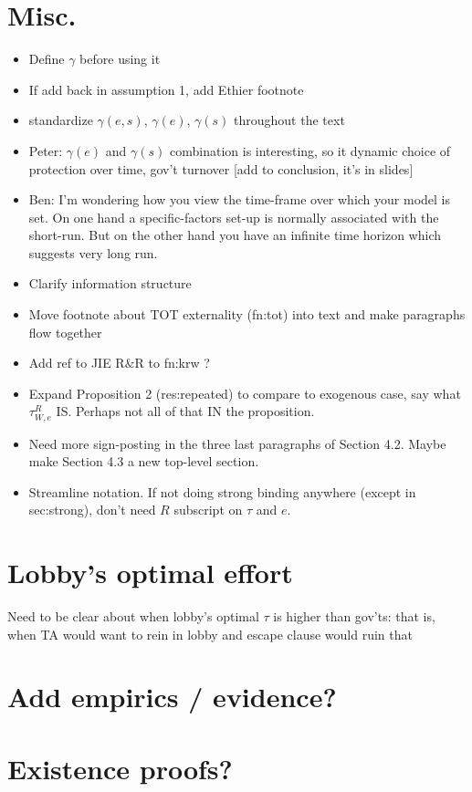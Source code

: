 \documentclass[12pt]{article}
\newcommand{\ga}{\gamma}
\begin{document}
\section{Misc.}
\begin{itemize}
	\item Define $\ga$ before using it
	\item If add back in assumption 1, add Ethier footnote
	\item standardize $\ga(e,s)$, $\ga(e)$, $\ga(s)$ throughout the text
	\item Peter: $\ga(e)$ and $\ga(s)$ combination is interesting, so it dynamic choice of protection over time, gov't turnover [add to conclusion, it's in slides]
	\item Ben: I'm wondering how you view the time-frame over which your model is set.  On one hand a specific-factors set-up is normally associated with the short-run.  But on the other hand you have an infinite time horizon which suggests very long run.
	\item Clarify information structure
	\item Move footnote about TOT externality (fn:tot) into text and make paragraphs flow together
	\item Add ref to JIE R$\&$R to fn:krw ?
	\item Expand Proposition 2 (res:repeated) to compare to exogenous case, say what $\tau^R_{W,e}$ IS. Perhaps not all of that IN the proposition.
	\item Need more sign-posting in the three last paragraphs of Section 4.2. Maybe make Section 4.3 a new top-level section.
	\item Streamline notation. If not doing strong binding anywhere (except in sec:strong), don't need $R$ subscript on $\tau$ and $e$.
\end{itemize}



\section{Lobby's optimal effort}
Need to be clear about when lobby's optimal $\tau$ is higher than gov'ts: that is, when TA would want to rein in lobby and escape clause would ruin that


\section{Add empirics / evidence?}


\section{Existence proofs?}
\end{document}

